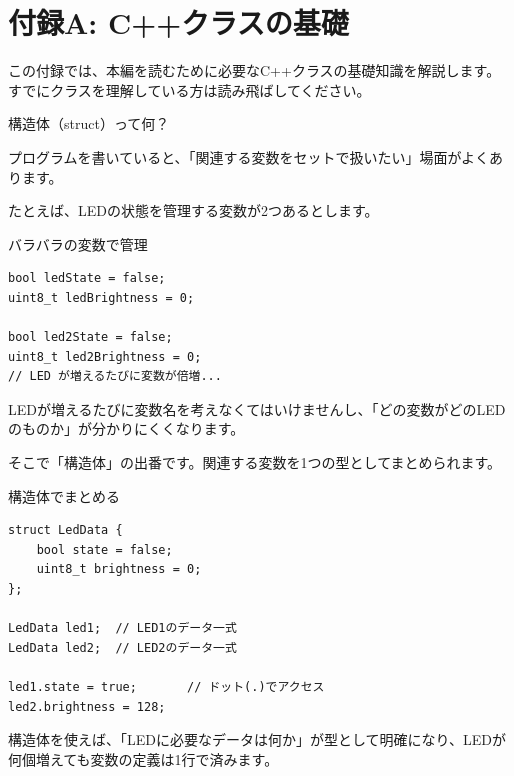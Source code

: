 \section*{付録A: C++クラスの基礎}
\label{sec:appendix_class}

この付録では、本編を読むために必要なC++クラスの基礎知識を解説します。
すでにクラスを理解している方は読み飛ばしてください。

\begin{qabox}{構造体（struct）って何？}

プログラムを書いていると、「関連する変数をセットで扱いたい」場面がよくあります。

たとえば、LEDの状態を管理する変数が2つあるとします。

\begin{badexample}{バラバラの変数で管理}
\begin{lstlisting}
bool ledState = false;
uint8_t ledBrightness = 0;

bool led2State = false;
uint8_t led2Brightness = 0;
// LED が増えるたびに変数が倍増...
\end{lstlisting}
\end{badexample}

LEDが増えるたびに変数名を考えなくてはいけませんし、「どの変数がどのLEDのものか」が分かりにくくなります。

そこで「構造体」の出番です。関連する変数を1つの型としてまとめられます。

\begin{goodexample}{構造体でまとめる}
\begin{lstlisting}
struct LedData {
    bool state = false;
    uint8_t brightness = 0;
};

LedData led1;  // LED1のデータ一式
LedData led2;  // LED2のデータ一式

led1.state = true;       // ドット(.)でアクセス
led2.brightness = 128;
\end{lstlisting}
\end{goodexample}

構造体を使えば、「LEDに必要なデータは何か」が型として明確になり、LEDが何個増えても変数の定義は1行で済みます。
\end{qabox}

